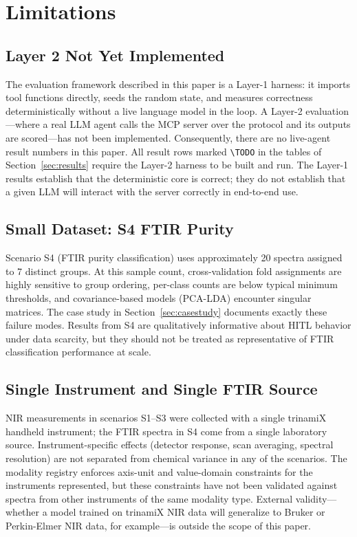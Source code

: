 
\section{Limitations}
\label{sec:limitations}

\subsection{Layer 2 Not Yet Implemented}

The evaluation framework described in this paper is a Layer-1 harness: it
imports tool functions directly, seeds the random state, and measures
correctness deterministically without a live language model in the loop.
A Layer-2 evaluation---where a real LLM agent calls the MCP server over the
protocol and its outputs are scored---has not been implemented.
Consequently, there are no live-agent result numbers in this paper.
All result rows marked \texttt{\textbackslash TODO} in the tables of
Section~\ref{sec:results} require the Layer-2 harness to be built and run.
The Layer-1 results establish that the deterministic core is correct; they
do not establish that a given LLM will interact with the server correctly
in end-to-end use.

\subsection{Small Dataset: S4 FTIR Purity}

Scenario S4 (FTIR purity classification) uses approximately 20 spectra
assigned to 7 distinct groups.
At this sample count, cross-validation fold assignments are highly sensitive
to group ordering, per-class counts are below typical minimum thresholds,
and covariance-based models (PCA-LDA) encounter singular matrices.
The case study in Section~\ref{sec:casestudy} documents exactly these
failure modes.
Results from S4 are qualitatively informative about HITL behavior under
data scarcity, but they should not be treated as representative of FTIR
classification performance at scale.

\subsection{Single Instrument and Single FTIR Source}

NIR measurements in scenarios S1--S3 were collected with a single
trinamiX handheld instrument; the FTIR spectra in S4 come from a single
laboratory source.
Instrument-specific effects (detector response, scan averaging, spectral
resolution) are not separated from chemical variance in any of the scenarios.
The modality registry enforces axis-unit and value-domain constraints for
the instruments represented, but these constraints have not been validated
against spectra from other instruments of the same modality type.
External validity---whether a model trained on trinamiX NIR data will
generalize to Bruker or Perkin-Elmer NIR data, for example---is outside the
scope of this paper.

